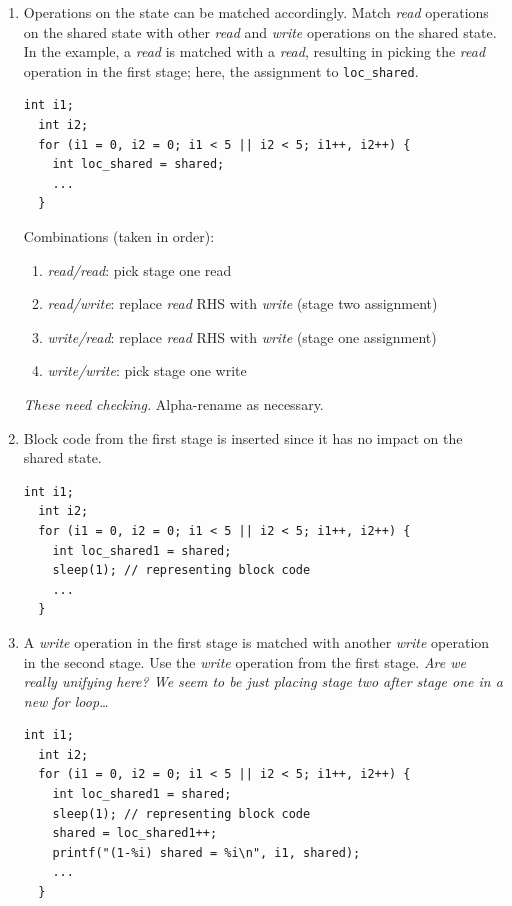 \begin{enumerate}
\begin{enumerate}
  \item Operations on the state can be matched accordingly. Match \emph{read} operations on the shared state with other \emph{read} and \emph{write} operations on the shared state. In the example, a \emph{read} is matched with a \emph{read}, resulting in picking the \emph{read} operation in the first stage; here, the assignment to \lstinline|loc_shared|.
  \begin{lstlisting}[frame=single]
  int i1;
  int i2;
  for (i1 = 0, i2 = 0; i1 < 5 || i2 < 5; i1++, i2++) {
    int loc_shared = shared;
    ...
  }
  \end{lstlisting}
  Combinations (taken in order):
  \begin{enumerate}
  \item \emph{read/read}: pick stage one read
  \item \emph{read/write}: replace \emph{read} RHS with \emph{write} (stage two assignment)
  \item \emph{write/read}: replace \emph{read} RHS with \emph{write} (stage one assignment)
  \item \emph{write/write}: pick stage one write
  \end{enumerate}
  \emph{These need checking.} Alpha-rename as necessary.
  
  \item Block code from the first stage is inserted since it has no impact on the shared state.
  \begin{lstlisting}[frame=single]
  int i1;
  int i2;
  for (i1 = 0, i2 = 0; i1 < 5 || i2 < 5; i1++, i2++) {
    int loc_shared1 = shared;
    sleep(1); // representing block code
    ...
  }
  \end{lstlisting}
  
  \item A \emph{write} operation in the first stage is matched with another \emph{write} operation in the second stage. Use the \emph{write} operation from the first stage. \emph{Are we really unifying here? We seem to be just placing stage two after stage one in a new for loop\dots}
  \begin{lstlisting}[frame=single]
  int i1;
  int i2;
  for (i1 = 0, i2 = 0; i1 < 5 || i2 < 5; i1++, i2++) {
    int loc_shared1 = shared;
    sleep(1); // representing block code
    shared = loc_shared1++;
    printf("(1-%i) shared = %i\n", i1, shared);
    ...
  }
  \end{lstlisting}
  

\end{enumerate}
\end{enumerate}
